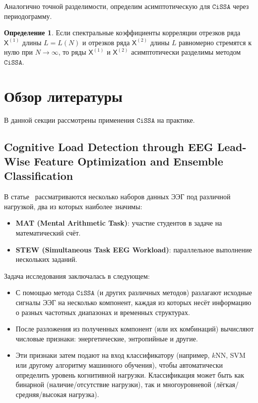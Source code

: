 \documentclass[12pt, specialist, subf
]{disser}
\theoremstyle{definition}
\newcommand{\CISSA}{\texttt{CiSSA}}
\newcommand{\TS}{\mathsf{X}}
\newtheorem{definition}{Определение} %
\begin{document}
Аналогично точной разделимости, определим асимптотическую для $\CISSA$ через периодограмму.

\begin{definition}
	\label{def:asymp_cissa}
	Если спектральные коэффициенты корреляции отрезков ряда \( \TS^{(1)} \) длины \( L = L(N) \) и отрезков ряда \( \TS^{(2)} \) длины \( L \) равномерно стремятся к нулю при \( N \to \infty \), то ряды \( \TS^{(1)} \) и \( \TS^{(2)} \) асимптотически разделимы методом $\CISSA$.
\end{definition}




\section{Обзор литературы}


В данной секции рассмотрены применения $\CISSA$ на практике.

\subsection{Cognitive Load Detection through EEG Lead-Wise Feature Optimization and Ensemble Classification}

В статье~\cite{cognitive} рассматриваются несколько наборов данных ЭЭГ под различной нагрузкой, два из которых наиболее значимы:

\begin{itemize}
	\item \textbf{MAT (Mental Arithmetic Task)}: участие студентов в задаче на математический счёт.
	\item \textbf{STEW (Simultaneous Task EEG Workload)}: параллельное выполнение нескольких заданий.
\end{itemize}

Задача исследования заключалась в следующем:

\begin{itemize}
	\item С помощью метода $\CISSA$ (и других различных методов) разлагают исходные сигналы ЭЭГ на несколько компонент, каждая из которых несёт информацию о разных частотных диапазонах и временных структурах.
	\item После разложения из полученных компонент (или их комбинаций) вычисляют числовые признаки: энергетические, энтропийные и другие.
	\item Эти признаки затем подают на вход классификатору (например, $k$NN, SVM или другому алгоритму машинного обучения), чтобы автоматически определить уровень когнитивной нагрузки. Классификация может быть как бинарной (наличие/отсутствие нагрузки), так и многоуровневой (лёгкая/средняя/высокая нагрузка).
\end{itemize}
\end{document}
